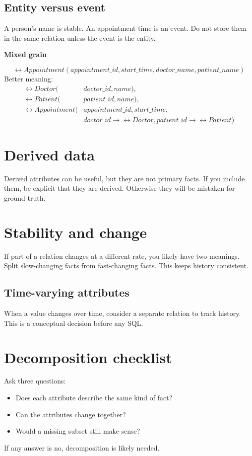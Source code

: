 \subsection{Entity versus event}
A person’s name is stable.
An appointment time is an event.
Do not store them in the same relation unless the event is the entity.

\begin{examplebox}
\textbf{Mixed grain}\par\smallskip
\[
\rel{Appointment}(appointment\_id, start\_time, doctor\_name, patient\_name)
\]
Better meaning:
\[
\begin{aligned}
\rel{Doctor}(&doctor\_id, name), \\
\rel{Patient}(&patient\_id, name), \\
\rel{Appointment}(&appointment\_id, start\_time, \\
&doctor\_id \rightarrow \rel{Doctor}, patient\_id \rightarrow \rel{Patient})
\end{aligned}
\]
\end{examplebox}

\section{Derived data}
Derived attributes can be useful, but they are not primary facts.
If you include them, be explicit that they are derived.
Otherwise they will be mistaken for ground truth.

\section{Stability and change}
If part of a relation changes at a different rate, you likely have two meanings.
Split slow-changing facts from fast-changing facts.
This keeps history consistent.

\subsection{Time-varying attributes}
When a value changes over time, consider a separate relation to track history.
This is a conceptual decision before any SQL.

\section{Decomposition checklist}
Ask three questions:
\begin{itemize}
  \item Does each attribute describe the same kind of fact?
  \item Can the attributes change together?
  \item Would a missing subset still make sense?
\end{itemize}
If any answer is no, decomposition is likely needed.

